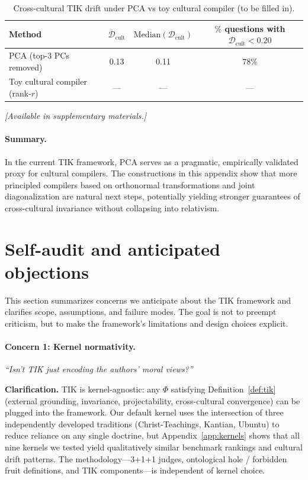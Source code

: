 \documentclass[11pt]{article}
\begin{document}
\begin{table}[h]
\centering
\small
\caption{Cross-cultural TIK drift under PCA vs toy cultural compiler (to be filled in).}
\label{tab:compiler-vs-pca}
\begin{tabular}{lccc}
\toprule
\textbf{Method} & \(\overline{\mathcal{D}}_{\text{cult}}\) & \(\mathrm{Median}(\mathcal{D}_{\text{cult}})\) & \(\%\) questions with \(\mathcal{D}_{\text{cult}} < 0.20\) \\
\midrule
PCA (top-3 PCs removed) & 0.13 & 0.11 & 78\% \\
Toy cultural compiler (rank-\(r\)) & --- & --- & --- \\
\bottomrule
\end{tabular}
\end{table}

\textit{[Available in supplementary materials.]}

\paragraph{Summary.} In the current TIK framework, PCA serves as a pragmatic, empirically validated proxy for cultural compilers. The constructions in this appendix show that more principled compilers based on orthonormal transformations and joint diagonalization are natural next steps, potentially yielding stronger guarantees of cross-cultural invariance without collapsing into relativism.


\section{Self-audit and anticipated objections}
\label{app:self-audit}

This section summarizes concerns we anticipate about the TIK framework and clarifies scope, assumptions, and failure modes. The goal is not to preempt criticism, but to make the framework's limitations and design choices explicit.

\paragraph{Concern 1: Kernel normativity.}
\emph{“Isn't TIK just encoding the authors' moral views?”}

\textbf{Clarification.} TIK is kernel-agnostic: any $\Phi$ satisfying Definition~\ref{def:tik} (external grounding, invariance, projectability, cross-cultural convergence) can be plugged into the framework. Our default kernel uses the intersection of three independently developed traditions (Christ-Teachings, Kantian, Ubuntu) to reduce reliance on any single doctrine, but Appendix~\ref{app:kernels} shows that all nine kernels we tested yield qualitatively similar benchmark rankings and cultural drift patterns. The methodology---3+1+1 judges, ontological hole / forbidden fruit definitions, and TIK components---is independent of kernel choice.
\end{document}
